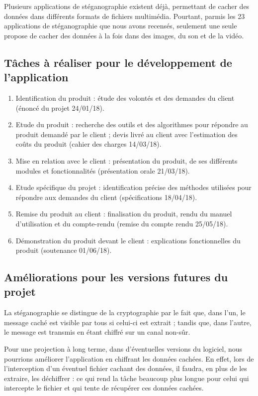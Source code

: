 \documentclass[11pt]{article}
\begin{document}
Plusieurs applications de stéganographie existent déjà, permettant de cacher des
données dans différents formats de fichiers multimédia. Pourtant, parmis les 23
applications de stéganographie que nous avons recensés, seulement une seule
propose de cacher des données à la fois dans des images, du son et de la vidéo.

\subsection{Tâches à réaliser pour le développement de l'application}

\begin {enumerate}
\item Identification du produit : étude des volontés et des demandes du client
    (énoncé du projet 24/01/18).
\item Etude du produit : recherche des outils et des algorithmes pour répondre
    au produit demandé par le client ; devis livré au client avec l'estimation
    des coûts du produit (cahier des charges 14/03/18).
\item Mise en relation avec le client : présentation du produit, de ses
    différents modules et fonctionnalités (présentation orale 21/03/18).
\item Etude spécifique du projet : identification précise des méthodes utilisées
    pour répondre aux demandes du client (spécifications 18/04/18).
\item Remise du produit au client : finalisation du produit, rendu du manuel
    d'utilisation et du compte-rendu (remise du compte rendu 25/05/18).
\item Démonstration du produit devant le client : explications fonctionnelles du
    produit (soutenance 01/06/18).
\end{enumerate}

\subsection{Améliorations pour les versions futures du projet}

La stéganographie se distingue de la cryptographie par le fait que, dans l'un,
le message caché est visible par tous si celui-ci est extrait ; tandis que, dans
l'autre, le message est transmis en étant chiffré sur un canal non-sûr. 

Pour une projection à long terme, dans d'éventuelles versions du logiciel, nous
pourrions améliorer l'application en chiffrant les données cachées. En effet,
lors de l'interception d'un éventuel fichier cachant des données, il faudra, en
plus de les extraire, les déchiffrer : ce qui rend la tâche beaucoup plus longue
pour celui qui intercepte le fichier et qui tente de récupérer ces données
cachées. 
\end{document}
